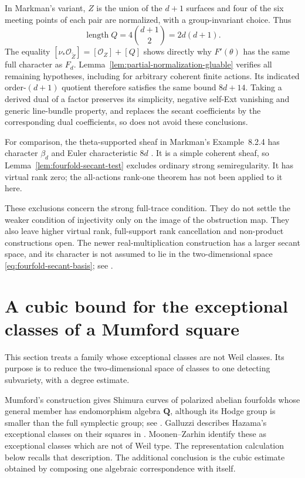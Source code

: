 \documentclass[11pt]{article}
\theoremstyle{definition}
\theoremstyle{remark}
\newcommand{\Q}{\mathbf Q}
\begin{document}
In Markman's variant, $Z$ is the union of the $d+1$ surfaces and
four of the six meeting points of each pair are normalized, with
a group-invariant choice.  Thus
\[
 \operatorname{length}Q=4\binom{d+1}{2}=2d(d+1).
\]
The equality $[\nu_*\mathcal O_{\widetilde Z}]=[\mathcal O_Z]+[Q]$
shows directly why $F'(\theta)$ has the same full character as
$F_d$.  Lemma~\ref{lem:partial-normalization-gluable} verifies all
remaining hypotheses, including for arbitrary coherent finite
actions.  Its indicated order-$(d+1)$ quotient therefore satisfies
the same bound $8d+14$.  Taking a derived dual of a factor preserves
its simplicity, negative self-Ext vanishing and generic line-bundle
property, and replaces the secant coefficients by the corresponding
dual coefficients, so does not avoid these conclusions.

For comparison, the theta-supported sheaf in Markman's
Example~8.2.4 has character $\beta_d$ and Euler characteristic $8d$
\cite[pp.~54--55]{MarkmanSecantFourfold}.  It is a simple coherent
sheaf, so Lemma~\ref{lem:fourfold-secant-test} excludes ordinary
strong semiregularity.  It has virtual rank zero; the all-actions
rank-one theorem has not been applied to it here.

These exclusions concern the strong full-trace condition.  They do
not settle the weaker condition of injectivity only on the image
of the obstruction map.  They also leave higher virtual rank,
full-support rank cancellation and non-product constructions open.
The newer real-multiplication construction has a larger secant space,
and its character is not assumed to lie in the two-dimensional
space \eqref{eq:fourfold-secant-basis}; see
\cite[Question~11.2.2 and Example~11.2.7]{MarkmanReal2026}.

\section{A cubic bound for the exceptional classes of a Mumford square}
\label{sec:mumford}
This section treats a family whose exceptional classes are not Weil
classes. Its purpose is to reduce the two-dimensional space of classes
to one detecting subvariety, with a degree estimate.

Mumford's construction gives Shimura curves of polarized abelian
fourfolds whose general member has endomorphism algebra $\Q$, although
its Hodge group is smaller than the full symplectic group; see
\cite[\S1.1]{Noot}. Galluzzi describes Hazama's exceptional classes on
their squares in \cite[Introduction, p.~727;
Propositions~4.1--4.2, pp.~733--734]{Galluzzi}.
Moonen--Zarhin \cite[Theorem~0.1(iii), p.~2]{MoonenZarhin}
identify these as exceptional classes which are not of Weil type.
The representation calculation below recalls that description. The
additional conclusion is the cubic estimate obtained by composing one
algebraic correspondence with itself.
\end{document}
